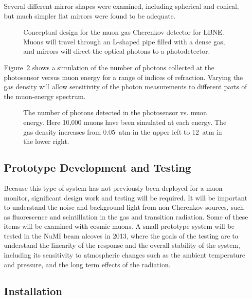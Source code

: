 Several different mirror shapes were examined, including spherical and 
conical, but much simpler flat mirrors were found to be adequate. 


\begin{figure}[htbp]
\centering
\caption[Muon gas Cherenkov counter design]
{Conceptual design for the muon gas Cherenkov detector for LBNE.  
Muons will travel through an L-shaped pipe filled with a dense gas,
and mirrors will direct the optical photons to a photodetector. }

\label{fig:mirrors}
\end{figure}

Figure~\ref{fig:varyindex} shows a simulation of 
the number of photons collected at the photosensor versus muon energy for
a range of indices of refraction.  Varying the gas density will allow sensitivity of 
the photon measurements to different parts of the muon-energy spectrum.

\begin{figure}[htbp]
\centering
\caption[Cherenkov counter response to muons]
{The number of photons detected in the photosensor vs. muon energy.  
Here 10,000 muons have been simulated at each energy.  The gas density
increases from 0.05~atm in the upper left to 12~atm in the lower
right. }
\label{fig:varyindex}
\end{figure}

\subsection{Prototype Development and Testing}

Because this type of system has not previously been deployed for a
muon monitor, significant design work and testing will be required. It will
be important to understand the noise and background light from
non-Cherenkov sources, such as fluorescence and scintillation in the
gas and transition radiation. Some of these items will be examined with cosmic muons.  A 
small prototype system will be tested in the NuMI beam alcoves in 2013, where the goals of the testing 
are to understand the linearity of the response and the overall stability of the system, 
including its sensitivity to atmospheric changes such as the ambient temperature and 
pressure, and the long term effects of the radiation.

\subsection{Installation}

